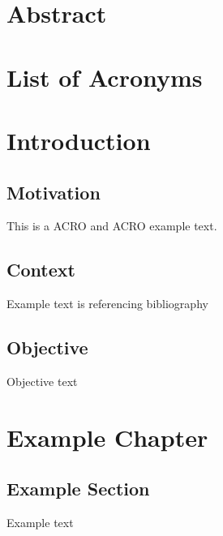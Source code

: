 \documentclass[12pt]{report} %
\begin{document}
\newpage
\chapter*{Abstract}

\newpage
\tableofcontents
{}

\newpage
\listoffigures
{}

\newpage
\listoftables
{}

\newpage
\chapter*{List of Acronyms}
\begin{acronym}
\end{acronym}

\newpage
{}
\onehalfspacing
\setlength{\parskip}{6pt}
\setlength{\parindent}{0pt}

\chapter{Introduction}
\section{Motivation}
This is a \ac{ACRO} and \acs{ACRO} example text.

\newpage
\section{Context}
Example text is referencing bibliography\cite{refName}

\newpage
\section{Objective}
Objective text

\chapter{Example Chapter}
\section{Example Section}
Example text
\end{document}
